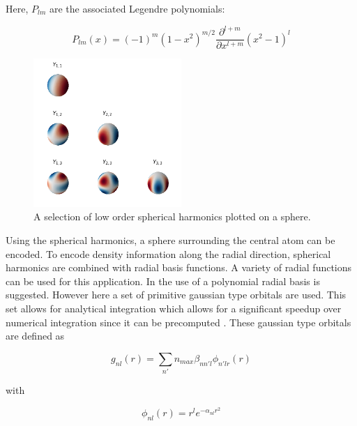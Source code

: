 Here, $P_{lm}$ are the associated Legendre polynomials:

$$
P_{lm}(x) = (-1)^m (1-x^2)^{m/2} \frac{\partial^{l+m}}{\partial x^{l+m}}(x^2 - 1)^l
$$ %


\begin{figure} [h]
  \centering
  \includegraphics[width=0.5\textwidth]{figures/snap/sph-harm.png} %
  \caption[Spherical harmonics]{A selection of low order spherical harmonics plotted on a sphere. } %
  \label{fig:sphharm}
\end{figure}

Using the spherical harmonics, a sphere surrounding the central atom can be encoded.
To encode density information along the radial direction, spherical harmonics are combined with radial basis functions.
A variety of radial functions can be used for this application.
In \cite{KUHL1982236} the use of a polynomial radial basis is suggested.
However here a set of primitive gaussian type orbitals are used.
This set allows for analytical integration which allows for a significant speedup over numerical integration since it can be precomputed \cite{dscribe}.
These gaussian type orbitals are defined as

$$g_{nl}(r) = \sum_{n'}{n_{max}} \beta_{nn'l} \phi_{n'lr}(r) $$

with 

$$\phi_{nl}(r) = r^l e^{-\alpha_{nl}r^2} $$ %


